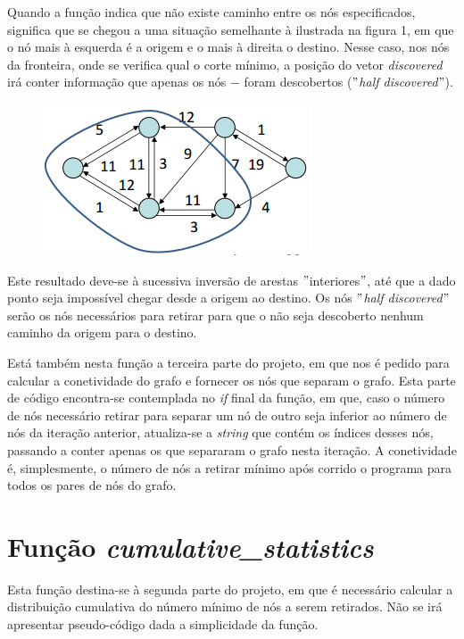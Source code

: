 \documentclass[a4paper]{article}
\begin{document}
Quando a função indica que não existe caminho entre os nós especificados, significa que se chegou a uma situação semelhante à ilustrada na figura 1, em que o nó mais à esquerda é a origem e o mais à direita o destino. Nesse caso, nos nós da fronteira, onde se verifica qual o corte mínimo, a posição do vetor \textit{discovered} irá conter informação que apenas os nós $-$ foram descobertos ($"$\textit{half discovered}$"$).


\begin{figure}[hb]
  \centering
  \includegraphics[scale=0.90]{slides.png}
  \caption{}
\end{figure}

Este resultado deve-se à sucessiva inversão de arestas $"$interiores$"$, até que a dado ponto seja impossível chegar desde a origem ao destino. Os nós $"$\textit{half discovered}$"$ serão os nós necessários para retirar para que o não seja descoberto nenhum caminho da origem para o destino.

Está também nesta função a terceira parte do projeto, em que nos é pedido para calcular a conetividade do grafo e fornecer os nós que separam o grafo. Esta parte de código encontra-se contemplada no \textit{if} final da função, em que, caso o número de nós necessário retirar para separar um nó de outro seja inferior ao número de nós da iteração anterior, atualiza-se a \textit{string} que contém os índices desses nós, passando a conter apenas os que separaram o grafo nesta iteração. A conetividade é, simplesmente, o número de nós a retirar mínimo após corrido o programa para todos os pares de nós do grafo.

\section{Função \textit{cumulative\_statistics}}
Esta função destina-se à segunda parte do projeto, em que é necessário calcular a distribuição cumulativa do número mínimo de nós a serem retirados. Não se irá apresentar pseudo-código dada a simplicidade da função.
\end{document}
